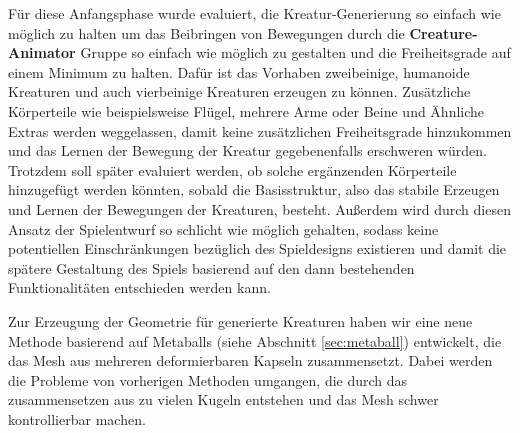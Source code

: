 Für diese Anfangsphase wurde evaluiert, die Kreatur-Generierung so einfach wie möglich zu halten um das Beibringen von Bewegungen durch die \textbf{Creature-Animator} Gruppe so einfach wie möglich zu gestalten und die Freiheitsgrade auf einem Minimum zu halten. Dafür ist das Vorhaben zweibeinige, humanoide Kreaturen und auch vierbeinige Kreaturen erzeugen zu können. Zusätzliche Körperteile wie beispielsweise Flügel, mehrere Arme oder Beine und Ähnliche Extras werden weggelassen, damit keine zusätzlichen Freiheitsgrade hinzukommen und das Lernen der Bewegung der Kreatur gegebenenfalls erschweren würden. Trotzdem soll später evaluiert werden, ob solche ergänzenden Körperteile hinzugefügt werden könnten, sobald die Basisstruktur, also das stabile Erzeugen und Lernen der Bewegungen der Kreaturen, besteht. Außerdem wird durch diesen Ansatz der Spielentwurf so schlicht wie möglich gehalten, sodass keine potentiellen Einschränkungen bezüglich des Spieldesigns existieren und damit die spätere Gestaltung des Spiels basierend auf den dann bestehenden Funktionalitäten entschieden werden kann. 

Zur Erzeugung der Geometrie für generierte Kreaturen haben wir eine neue Methode basierend auf Metaballs (siehe Abschnitt \ref{sec:metaball}) entwickelt, die das Mesh aus mehreren deformierbaren Kapseln zusammensetzt. Dabei werden die Probleme von vorherigen Methoden umgangen, die durch das zusammensetzen aus zu vielen Kugeln entstehen und das Mesh schwer kontrollierbar machen.


